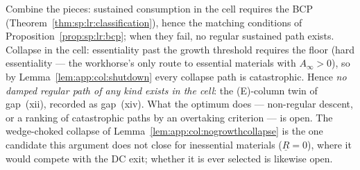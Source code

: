  Combine the
pieces: sustained consumption in the cell requires the BCP
(Theorem~\ref{thm:sp:lr:classification}), hence the matching conditions of
Proposition~\ref{prop:sp:lr:bcp}; when they fail, no regular sustained path exists. Collapse
in the cell: essentiality past the growth threshold requires the floor
(hard essentiality --- the workhorse's only route to essential materials with
$A_\infty>0$), so by Lemma~\ref{lem:app:col:shutdown} every collapse path is catastrophic.
Hence \emph{no damped regular path of any kind exists in the cell}: the (E)-column twin of
gap~(xii), recorded as gap~(xiv). What the optimum does --- non-regular descent, or a ranking
of catastrophic paths by an overtaking criterion --- is open. The wedge-choked collapse
of Lemma~\ref{lem:app:col:nogrowthcollapse} is the one candidate this argument does not
close for inessential materials ($\underline R=0$), where it would compete with the DC exit;
whether it is ever selected is likewise open.

